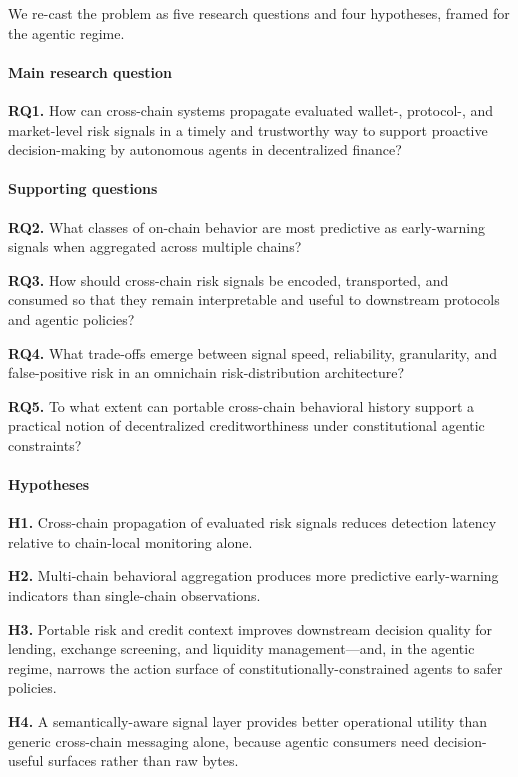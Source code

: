 \documentclass[journal]{IEEEtran}
\begin{document}
We re-cast the problem as five research questions and four
hypotheses, framed for the agentic regime.

\paragraph*{Main research question}
\textbf{RQ1.} How can cross-chain systems propagate evaluated wallet-,
protocol-, and market-level risk signals in a timely and trustworthy
way to support proactive decision-making by autonomous agents in
decentralized finance?

\paragraph*{Supporting questions}
\textbf{RQ2.} What classes of on-chain behavior are most predictive as
early-warning signals when aggregated across multiple chains?

\textbf{RQ3.} How should cross-chain risk signals be encoded,
transported, and consumed so that they remain interpretable and useful
to downstream protocols and agentic policies?

\textbf{RQ4.} What trade-offs emerge between signal speed, reliability,
granularity, and false-positive risk in an omnichain risk-distribution
architecture?

\textbf{RQ5.} To what extent can portable cross-chain behavioral
history support a practical notion of decentralized creditworthiness
under constitutional agentic constraints?

\paragraph*{Hypotheses}
\textbf{H1.} Cross-chain propagation of evaluated risk signals reduces
detection latency relative to chain-local monitoring alone.

\textbf{H2.} Multi-chain behavioral aggregation produces more
predictive early-warning indicators than single-chain observations.

\textbf{H3.} Portable risk and credit context improves downstream
decision quality for lending, exchange screening, and liquidity
management---and, in the agentic regime, narrows the action surface of
constitutionally-constrained agents to safer policies.

\textbf{H4.} A semantically-aware signal layer provides better
operational utility than generic cross-chain messaging alone, because
agentic consumers need decision-useful surfaces rather than raw bytes.
\end{document}
